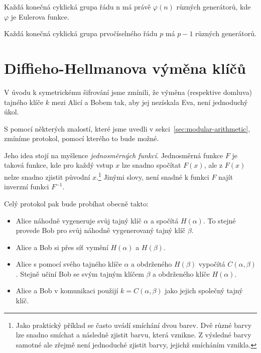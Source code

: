 \documentclass[
  program=infoi,
  biblatex,
  figures=false,
  glossaries,
  index
]{kidiplom}
\begin{document}
    \begin{theorem}\label{the:generators-count}
        Každá konečná cyklická grupa řádu n má právě $\varphi(n)$ různých generátorů, kde $\varphi$ je Eulerova funkce.
    \end{theorem}

    \begin{consequence}\label{con:generators-count}
        Každá konečná cyklická grupa prvočíselného řádu $p$ má $p-1$ různých generátorů.
    \end{consequence}



\section{Diffieho-Hellmanova výměna klíčů}\label{sec:diffie-hellman}



    V úvodu k symetrickému šifrování jsme zmínili, že výměna (respektive domluva)
    tajného klíče $k$ mezi Alicí a Bobem tak, aby jej nezískala Eva, není jednoduchý úkol.

    S pomocí některých znalostí, které jsme uvedli v sekci~\ref{sec:modular-arithmetic}, zmíníme protokol, pomocí kterého
    to bude možné.

    Jeho idea stojí na myšlence \emph{jednosměrných funkcí}. Jednosměrná funkce $F$ je taková funkce, kde pro každý vstup $x$ lze
    snadno spočítat $F(x)$, ale z $F(x)$ nelze snadno zjistit původní $x$.\footnote{Jako praktický příklad se často uvádí smíchání dvou barev.
    Dvě různé barvy lze snadno smíchat a následně zjistit barvu, která vznikne.
    Z výsledné barvy samotné ale zřejmě není jednoduché zjistit barvy, jejichž smícháním vznikla.}
    Jinými slovy, není snadné k funkci $F$ najít inverzní funkci $F^{-1}$.

    \medskip

    Celý protokol pak bude probíhat obecně takto:
    
    \begin{itemize}
        \item
            Alice náhodně vygeneruje svůj tajný klíč $\alpha$ a spočítá $H(\alpha)$.
            To stejné provede Bob pro svůj náhodně vygenerovaný tajný klíč $\beta$.
        \item
            Alice a Bob si přes síť vymění $H(\alpha)$ a $H(\beta)$.
        \item
            Alice s pomocí svého tajného klíče $\alpha$ a obdrženého $H(\beta)$ vypočítá $C(\alpha,\beta)$.
            Stejně učiní Bob se svým tajným klíčem $\beta$ a obdrženého klíče $H(\alpha)$.
        \item
            Alice a Bob v komunikaci použijí $k = C(\alpha,\beta)$ jako jejich společný tajný klíč.
    \end{itemize}
\end{document}
